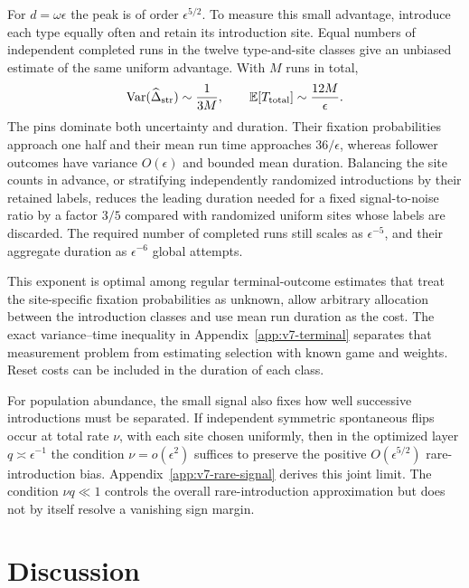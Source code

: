 \documentclass[aps,pre,reprint,amsmath,amssymb,longbibliography]{revtex4-2}
\newcommand{\E}{\mathbb E}
\begin{document}
For $d=\omega\epsilon$ the peak is of order $\epsilon^{5/2}$.
To measure this small advantage, introduce each type equally often
and retain its introduction site. Equal numbers of independent
completed runs in the twelve type-and-site classes give an unbiased
estimate of the same uniform advantage. With $M$ runs in total,
\begin{equation}
 \operatorname{Var}(\widehat\Delta_{\rm str})\sim\frac1{3M},
 \qquad
 \E[T_{\rm total}]\sim\frac{12M}{\epsilon}.
 \label{eq:v3-main-variance}
\end{equation}
The pins dominate both uncertainty and duration. Their fixation
probabilities approach one half and their mean run time approaches
$36/\epsilon$, whereas follower outcomes have variance
$O(\epsilon)$ and bounded mean duration. Balancing the site counts in advance, or stratifying independently
randomized introductions by their retained labels, reduces the leading
duration needed for a fixed signal-to-noise ratio by a factor $3/5$
compared with randomized uniform sites whose labels are discarded. The required number of completed runs still scales as
$\epsilon^{-5}$, and their aggregate duration as $\epsilon^{-6}$
global attempts.

This exponent is optimal among regular terminal-outcome estimates
that treat the site-specific fixation probabilities as unknown,
allow arbitrary allocation between the introduction classes and
use mean run duration as the cost. The exact variance--time
inequality in Appendix~\ref{app:v7-terminal} separates that
measurement problem from estimating selection with known game and
weights. Reset costs can be included in the duration of each class.



For population abundance, the small signal also fixes how well
successive introductions must be separated. If independent symmetric
spontaneous flips occur at total rate $\nu$, with each site chosen
uniformly, then in the optimized layer $q\asymp\epsilon^{-1}$ the
condition $\nu=o(\epsilon^2)$ suffices to preserve the positive
$O(\epsilon^{5/2})$ rare-introduction bias.
Appendix~\ref{app:v7-rare-signal} derives this joint limit. The
condition $\nu q\ll1$ controls the overall rare-introduction
approximation but does not by itself resolve a vanishing sign margin.




\section{Discussion}
\label{sec:discussion}
\end{document}
